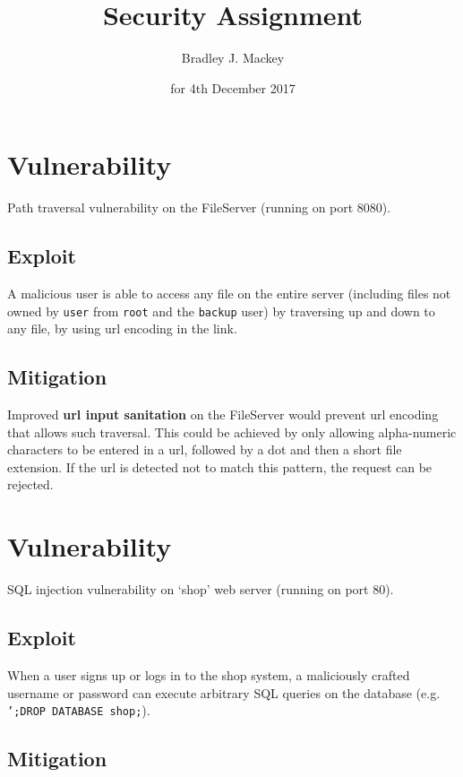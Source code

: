 \documentclass[11pt]{article}
\begin{document}
\title{\textbf{Security Assignment}}
\date{for 4th December 2017}
\author{Bradley J. Mackey}
\maketitle

\section{Vulnerability}

Path traversal vulnerability on the FileServer (running on port 8080).

\subsection{Exploit}

A malicious user is able to access any file on the entire server (including files not owned by \texttt{user} from \texttt{root} and the \texttt{backup} user) by traversing up and down to any file, by using url encoding in the link.

\subsection{Mitigation}

Improved \textbf{url input sanitation} on the FileServer would prevent url encoding that allows such traversal. This could be achieved by only allowing alpha-numeric characters to be entered in a url, followed by a dot and then a short file extension. If the url is detected not to match this pattern, the request can be rejected.

\section{Vulnerability}

SQL injection vulnerability on `shop' web server (running on port 80).

\subsection{Exploit}

When a user signs up or logs in to the shop system, a maliciously crafted username or password can execute arbitrary SQL queries on the database (e.g. \texttt{';DROP DATABASE shop;}). 

\subsection{Mitigation}
\end{document}

